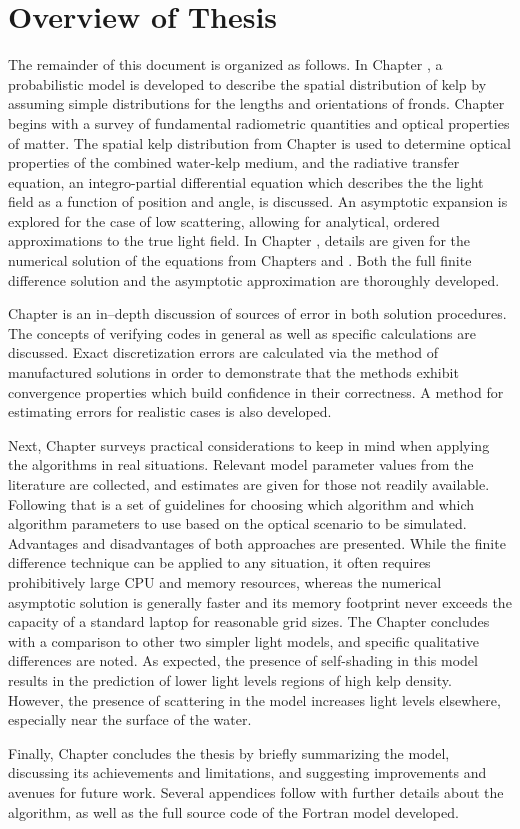 \section{Overview of Thesis}
The remainder of this document is organized as follows.
In Chapter \Rom{\ref{chap:kelp}}, a probabilistic model is developed to describe the spatial distribution of kelp by assuming simple distributions for the lengths and orientations of fronds.
Chapter \Rom{\ref{chap:light}} begins with a survey of fundamental radiometric quantities and optical properties of matter.
The spatial kelp distribution from Chapter \Rom{\ref{chap:kelp}} is used to determine optical properties of the combined water-kelp medium,
and the radiative transfer equation, an integro-partial differential equation which describes the the light field as a function of position and angle, is discussed.
An asymptotic expansion is explored for the case of low scattering, allowing for analytical, ordered approximations to the true light field.
In Chapter \Rom{\ref{chap:numerical}}, details are given for the numerical solution of the equations from Chapters \Rom{\ref{chap:kelp}} and \Rom{\ref{chap:light}}.
Both the full finite difference solution and the asymptotic approximation are thoroughly developed.

Chapter \Rom{\ref{chap:model_analysis}} is an in--depth discussion of sources of error in both solution procedures.
The concepts of verifying codes in general as well as specific calculations are discussed.
Exact discretization errors are calculated via the method of manufactured solutions in order to demonstrate
that the methods exhibit convergence properties which build confidence in their correctness.
A method for estimating errors for realistic cases is also developed.

Next, Chapter \Rom{\ref{chap:application}} surveys practical considerations to keep in mind when applying the algorithms in real situations.
Relevant model parameter values from the literature are collected, and estimates are given for those not readily available.
Following that is a set of guidelines for choosing which algorithm and which algorithm parameters to use based on the optical scenario to be simulated.
Advantages and disadvantages of both approaches are presented.
While the finite difference technique can be applied to any situation, it often requires prohibitively large CPU and memory resources, whereas the numerical asymptotic solution is generally faster and its memory footprint never exceeds the capacity of a standard laptop for reasonable grid sizes.
The Chapter concludes with a comparison to other two simpler light models, and specific qualitative differences are noted.
As expected, the presence of self-shading in this model results in the prediction of lower light levels regions of high kelp density.
However, the presence of scattering in the model increases light levels elsewhere, especially near the surface of the water.

Finally, Chapter \Rom{\ref{chap:conclusion}} concludes the thesis by briefly summarizing the model, discussing its achievements and limitations, and suggesting improvements and avenues for future work.
Several appendices follow with further details about the algorithm, as well as the full source code of the Fortran model developed.
